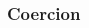 \documentclass[main]{subfiles}
\begin{document}
\begin{frame}\frametitle{Coercion}

\begin{columns}
\begin{column}{0.33\textwidth}

\end{column}
\begin{column}{0.33\textwidth}
\visible<+->{
\vspace{3em}
}
\end{column}
\end{columns}
\end{frame}
\end{document}
